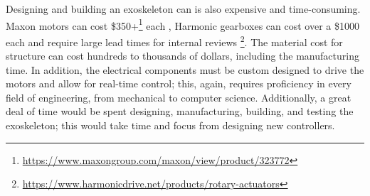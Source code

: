 Designing and building an exoskeleton can is also expensive and time-consuming. Maxon motors can cost \$350+\footnote{\url{https://www.maxongroup.com/maxon/view/product/323772}} each  , Harmonic gearboxes can cost over a \$1000 each and require large lead times for internal reviews \footnote{\url{https://www.harmonicdrive.net/products/rotary-actuators}}. The material cost for structure can cost hundreds to thousands of dollars, including the manufacturing time. In addition, the electrical components must be custom designed to drive the motors and allow for real-time control; this, again, requires proficiency in every field of engineering, from mechanical to computer science. Additionally, a great deal of time would be spent designing, manufacturing, building, and testing the exoskeleton; this would take time and focus from designing new controllers. 
 

 


